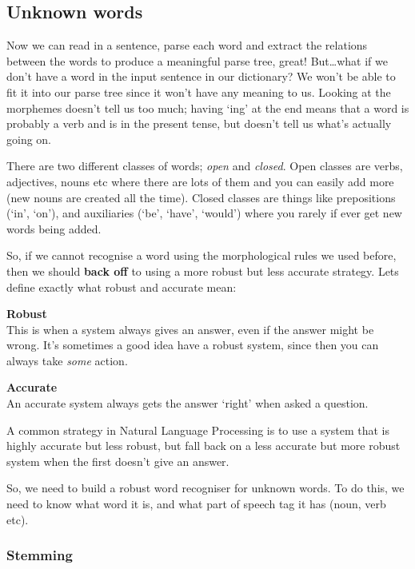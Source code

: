 \subsection{Unknown words}

Now we can read in a sentence, parse each word and extract the relations between
the words to produce a meaningful parse tree, great! But\dots what if we
don't have a word in the input sentence in our dictionary? We won't be able to
fit it into our parse tree since it won't have any meaning to us. Looking at the
morphemes doesn't tell us too much; having `ing' at the end means that a word is
probably a verb and is in the present tense, but doesn't tell us what's actually
going on.

There are two different classes of words; \textit{open} and \textit{closed}.
Open classes are verbs, adjectives, nouns etc where there are lots of them and
you can easily add more (new nouns are created all the time). Closed classes are
things like prepositions (`in', `on'), and auxiliaries (`be', `have', `would')
where you rarely if ever get new words being added.

So, if we cannot recognise a word using the morphological rules we used before,
then we should \textbf{back off} to using a more robust but less accurate
strategy. Lets define exactly what robust and accurate mean:

\begin{description}
  \item \textbf{Robust}\\
    This is when a system always gives an answer, even if the answer might be 
    wrong. It's sometimes a good idea have a robust system, since then you can 
    always take \textit{some} action.
  \item \textbf{Accurate}\\
    An accurate system always gets the answer `right' when asked a question.
\end{description}

A common strategy in Natural Language Processing is to use a system that is
highly accurate but less robust, but fall back on a less accurate but more
robust system when the first doesn't give an answer.

So, we need to build a robust word recogniser for unknown words. To do this, we
need to know what word it is, and what part of speech tag it has (noun, verb
etc).

\subsubsection{Stemming}


